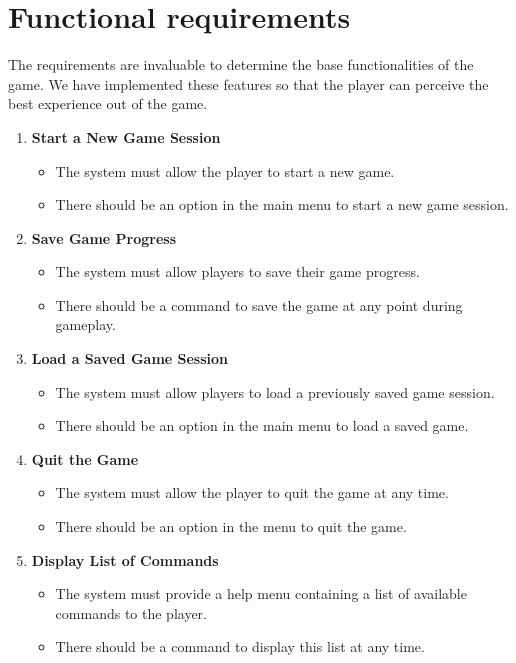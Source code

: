 \documentclass{article}
\begin{document}
 
\section{Functional requirements}

 The requirements are invaluable to determine the base functionalities of the game. We have implemented these features so that the player can perceive the best experience out of the game.

 
    \begin{enumerate}
        \item \textbf{Start a New Game Session}
\begin{itemize}
    \item The system must allow the player to start a new game.
    \item There should be an option in the main menu to start a new game session.
\end{itemize}

    \item \textbf{Save Game Progress}
\begin{itemize}
    \item The system must allow players to save their game progress.
    \item There should be a command to save the game at any point during gameplay.
\end{itemize}

    \item \textbf{Load a Saved Game Session}
\begin{itemize}
    \item The system must allow players to load a previously saved game session.
    \item There should be an option in the main menu to load a saved game.
\end{itemize}

    \item \textbf{Quit the Game}
\begin{itemize}
    \item The system must allow the player to quit the game at any time.
    \item There should be an option in the menu to quit the game.
\end{itemize}

    \item \textbf{Display List of Commands}
\begin{itemize}
    \item The system must provide a help menu containing a list of available commands to the player.
    \item There should be a command to display this list at any time.
\end{itemize}


\end{enumerate}
\end{document}
